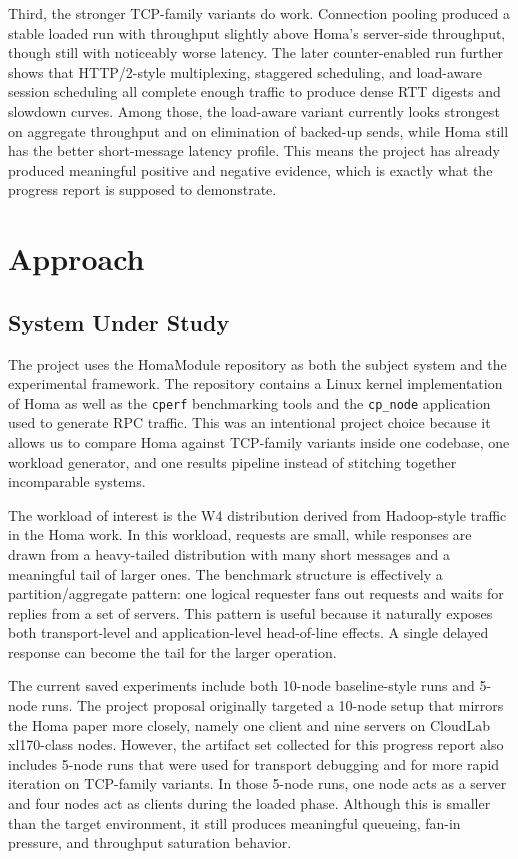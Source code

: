\documentclass[11pt]{article}
\begin{document}
Third, the stronger TCP-family variants do work. Connection pooling produced a stable loaded run with throughput slightly above Homa's server-side throughput, though still with noticeably worse latency. The later counter-enabled run further shows that HTTP/2-style multiplexing, staggered scheduling, and load-aware session scheduling all complete enough traffic to produce dense RTT digests and slowdown curves. Among those, the load-aware variant currently looks strongest on aggregate throughput and on elimination of backed-up sends, while Homa still has the better short-message latency profile. This means the project has already produced meaningful positive and negative evidence, which is exactly what the progress report is supposed to demonstrate.

\section{Approach}

\subsection{System Under Study}

The project uses the HomaModule repository as both the subject system and the experimental framework. The repository contains a Linux kernel implementation of Homa as well as the \texttt{cperf} benchmarking tools and the \texttt{cp\_node} application used to generate RPC traffic. This was an intentional project choice because it allows us to compare Homa against TCP-family variants inside one codebase, one workload generator, and one results pipeline instead of stitching together incomparable systems.

The workload of interest is the W4 distribution derived from Hadoop-style traffic in the Homa work. In this workload, requests are small, while responses are drawn from a heavy-tailed distribution with many short messages and a meaningful tail of larger ones. The benchmark structure is effectively a partition/aggregate pattern: one logical requester fans out requests and waits for replies from a set of servers. This pattern is useful because it naturally exposes both transport-level and application-level head-of-line effects. A single delayed response can become the tail for the larger operation.

The current saved experiments include both 10-node baseline-style runs and 5-node runs. The project proposal originally targeted a 10-node setup that mirrors the Homa paper more closely, namely one client and nine servers on CloudLab xl170-class nodes. However, the artifact set collected for this progress report also includes 5-node runs that were used for transport debugging and for more rapid iteration on TCP-family variants. In those 5-node runs, one node acts as a server and four nodes act as clients during the loaded phase. Although this is smaller than the target environment, it still produces meaningful queueing, fan-in pressure, and throughput saturation behavior.
\end{document}
